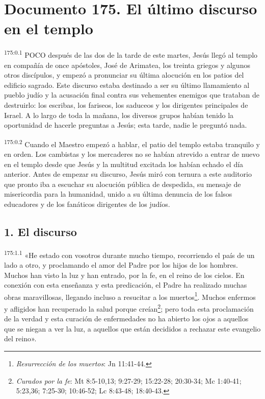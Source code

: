 \chapter{Documento 175. El último discurso en el templo}
\par 
\textsuperscript{175:0.1} POCO después de las dos de la tarde de este martes, Jesús llegó al templo en compañía de once apóstoles, José de Arimatea, los treinta griegos y algunos otros discípulos, y empezó a pronunciar su última alocución en los patios del edificio sagrado. Este discurso estaba destinado a ser su último llamamiento al pueblo judío y la acusación final contra sus vehementes enemigos que trataban de destruirlo: los escribas, los fariseos, los saduceos y los dirigentes principales de Israel. A lo largo de toda la mañana, los diversos grupos habían tenido la oportunidad de hacerle preguntas a Jesús; esta tarde, nadie le preguntó nada.

\par 
\textsuperscript{175:0.2} Cuando el Maestro empezó a hablar, el patio del templo estaba tranquilo y en orden. Los cambistas y los mercaderes no se habían atrevido a entrar de nuevo en el templo desde que Jesús y la multitud excitada los habían echado el día anterior. Antes de empezar su discurso, Jesús miró con ternura a este auditorio que pronto iba a escuchar su alocución pública de despedida, su mensaje de misericordia para la humanidad, unido a su última denuncia de los falsos educadores y de los fanáticos dirigentes de los judíos.

\section*{1. El discurso}
\par 
\textsuperscript{175:1.1} «He estado con vosotros durante mucho tiempo, recorriendo el país de un lado a otro, y proclamando el amor del Padre por los hijos de los hombres. Muchos han visto la luz y han entrado, por la fe, en el reino de los cielos. En conexión con esta enseñanza y esta predicación, el Padre ha realizado muchas obras maravillosas, llegando incluso a resucitar a los muertos\footnote{\textit{Resurrección de los muertos}: Jn 11:41-44.}. Muchos enfermos y afligidos han recuperado la salud porque creían\footnote{\textit{Curados por la fe}: Mt 8:5-10,13; 9:27-29; 15:22-28; 20:30-34; Mc 1:40-41; 5:23,36; 7:25-30; 10:46-52; Lc 8:43-48; 18:40-43.}; pero toda esta proclamación de la verdad y esta curación de enfermedades no ha abierto los ojos a aquellos que se niegan a ver la luz, a aquellos que están decididos a rechazar este evangelio del reino».

